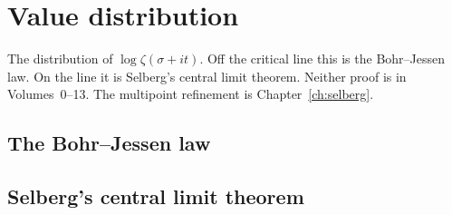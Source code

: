 \chapter{Value distribution}\label{ch:oc-values}

The distribution of $\log\zeta(\sigma+it)$. Off the critical line this is the Bohr--Jessen law. On the line it is Selberg's central limit theorem. Neither proof is in Volumes~0--13. The multipoint refinement is Chapter~\ref{ch:selberg}.

\section{The Bohr--Jessen law}\label{ch:bohrjessen}



\section{Selberg's central limit theorem}\label{ch:selbergclt}


